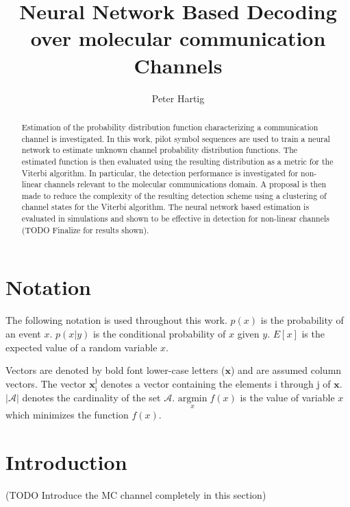 \documentclass[12pt,a4paper]{report}
\title{Neural Network Based Decoding over molecular communication Channels}
\author{Peter Hartig}
\begin{document}
\maketitle

\begin{abstract}
Estimation of the probability distribution function characterizing a communication channel is investigated. In this work, pilot symbol sequences are used to train a neural network to estimate unknown channel probability distribution functions. The estimated function is then evaluated using the resulting distribution as a metric for the Viterbi algorithm. In particular, the detection performance is investigated for non-linear channels relevant to the molecular communications domain. A proposal is then made to reduce the complexity of the resulting detection scheme using a clustering of channel states for the Viterbi algorithm. The neural network based estimation is evaluated in simulations and shown to be effective in detection for non-linear channels (TODO Finalize for results shown). 
\end{abstract}

\newpage
\tableofcontents
\newpage
\section{Notation}
The following notation is used throughout this work.
$p(x)$ is the probability of an event $x$.
$p(x|y)$ is the conditional probability of $x$ given $y$.
$E[x]$ is the expected value of a random variable $x$.

Vectors are denoted by bold font lower-case letters ($\mathbf{x}$) and are assumed column vectors.
The vector $\mathbf{x}_{\mathrm{i}}^{\mathrm{j}}$ denotes a vector containing the elements i through j of $\mathbf{x}$. $|\mathcal{A}|$ denotes the cardinality of the set $\mathcal{A}$.
$\underset{x}{\text{argmin}} \; f(x)$ is the value of variable $x$ which minimizes the function $f(x)$.

\section{Introduction}
(TODO Introduce the MC channel completely in this section)
\end{document}
